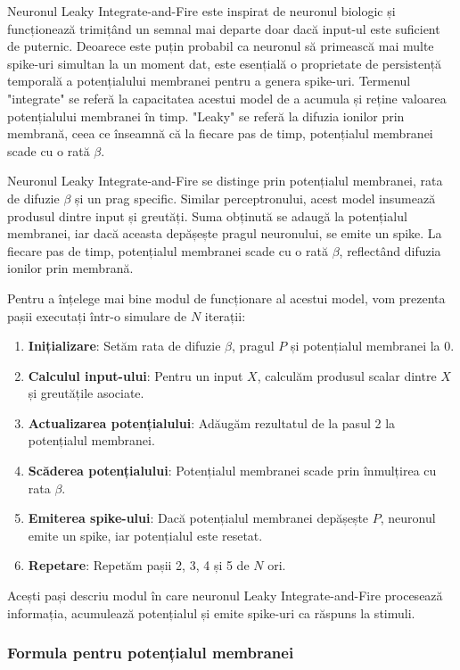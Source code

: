 Neuronul Leaky Integrate-and-Fire este inspirat de neuronul biologic și funcționează trimițând un semnal mai departe doar dacă input-ul este suficient de puternic. Deoarece este puțin probabil ca neuronul să primească mai multe spike-uri simultan la un moment dat, este esențială o proprietate de persistență temporală a potențialului membranei pentru a genera spike-uri. Termenul "integrate" se referă la capacitatea acestui model de a acumula și reține valoarea potențialului membranei în timp. "Leaky" se referă la difuzia ionilor prin membrană, ceea ce înseamnă că la fiecare pas de timp, potențialul membranei scade cu o rată \(\beta\).

Neuronul Leaky Integrate-and-Fire se distinge prin potențialul membranei, rata de difuzie \(\beta\) și un prag specific. Similar perceptronului, acest model insumează produsul dintre input și greutăți. Suma obținută se adaugă la potențialul membranei, iar dacă aceasta depășește pragul neuronului, se emite un spike. La fiecare pas de timp, potențialul membranei scade cu o rată \(\beta\), reflectând difuzia ionilor prin membrană.


Pentru a înțelege mai bine modul de funcționare al acestui model, vom prezenta pașii executați într-o simulare de \(N\) iterații:

\begin{enumerate}
    \item \textbf{Inițializare}: Setăm rata de difuzie \(\beta\), pragul \(P\) și potențialul membranei la 0.
    \item \textbf{Calculul input-ului}: Pentru un input \(X\), calculăm produsul scalar dintre \(X\) și greutățile asociate.
    \item \textbf{Actualizarea potențialului}: Adăugăm rezultatul de la pasul 2 la potențialul membranei.
    \item \textbf{Scăderea potențialului}: Potențialul membranei scade prin înmulțirea cu rata \(\beta\).
    \item \textbf{Emiterea spike-ului}: Dacă potențialul membranei depășește \(P\), neuronul emite un spike, iar potențialul este resetat.
    \item \textbf{Repetare}: Repetăm pașii 2, 3, 4 și 5 de \(N\) ori.
\end{enumerate}

Acești pași descriu modul în care neuronul Leaky Integrate-and-Fire procesează informația, acumulează potențialul și emite spike-uri ca răspuns la stimuli.

\subsubsection{Formula pentru potențialul membranei}

